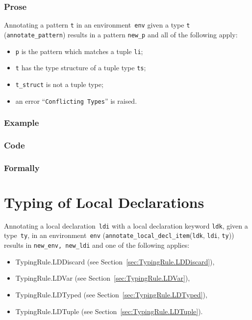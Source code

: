\documentclass{book}
\newcommand\annotatelocaldeclitem[1]{\texttt{annotate\_local\_decl\_item}(#1)}
\newcommand\ldi[0]{\texttt{ldi}}
\newcommand\ldk[0]{\texttt{ldk}}
\newcommand\tty[0]{\texttt{ty}}
\begin{document}
  \subsection{Prose}
   Annotating a pattern \texttt{t} in an environment~\texttt{env} given a type \texttt{t} (\texttt{annotate\_pattern}) results in a pattern \texttt{new\_p} and all of the following apply:
   \begin{itemize}
   \item \texttt{p} is the pattern which matches a tuple \texttt{li};
   \item \texttt{t} has the type structure of a tuple type \texttt{ts};
   \item \texttt{t\_struct} is not a tuple type;
   \item an error ``\texttt{Conflicting Types}'' is raised.
   \end{itemize}

  \subsection{Example}

  \subsection{Code}

\begin{emptyformal}
    \subsection{Formally}
\end{emptyformal}


\chapter{Typing of Local Declarations}

Annotating a local declaration~\texttt{ldi} with a local declaration keyword \texttt{ldk}, given a type~\texttt{ty}, in an
environment~\texttt{env} (\annotatelocaldeclitem{\ldk, \ldi, \tty}) results in \texttt{new\_env, new\_ldi} and one of the following applies:
\begin{itemize}
\item TypingRule.LDDiscard (see Section~\ref{sec:TypingRule.LDDiscard}),
\item TypingRule.LDVar (see Section~\ref{sec:TypingRule.LDVar}),
\item TypingRule.LDTyped (see Section~\ref{sec:TypingRule.LDTyped}),
\item TypingRule.LDTuple (see Section~\ref{sec:TypingRule.LDTuple}).
\end{itemize}
\end{document}
